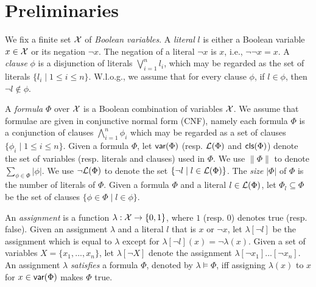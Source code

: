 \section{Preliminaries}\label{sec:prel}

We fix a finite set  $\mathcal{X}$ of \emph{Boolean variables}.
A \emph{literal} $l$ is either a Boolean variable $x\in \mathcal{X}$ or its negation $\neg x$.
The negation of a literal $\neg x$ is $x$, i.e., $\neg\neg x=x$.
A \emph{clause} $\phi$ is a disjunction of literals $\bigvee_{i=1}^n l_i$, which may be regarded as
the set of literals $\{l_i\mid 1\leq i\leq n\}$. W.l.o.g., we assume that for every
clause $\phi$, if $l\in\phi$, then $\neg l\not\in \phi$.

A \emph{formula} $\Phi$ over $\mathcal{X}$ is a Boolean combination of variables $\mathcal{X}$.
We assume that formulae are given in conjunctive normal
form (CNF), namely each formula $\Phi$ is a conjunction of clauses $\bigwedge_{i=1}^n\phi_i$ which may be regarded as a set of clauses $\{\phi_i\mid 1\leq i\leq n\}$. Given a formula $\Phi$, let $\textsf{var}(\Phi)$ (resp. ${\cal L}(\Phi)$  and $\textsf{cls}(\Phi)$) denote the set of variables (resp. literals and clauses) used in $\Phi$.
We use $\|\Phi\|$ to denote $\sum_{\phi\in\Phi}|\phi|$.
We use $\neg{\cal L}(\Phi)$ to denote the set $\{\neg l \mid l\in {\cal L}(\Phi)\}$.
The \emph{size} $|\Phi|$ of $\Phi$ is the number of literals of $\Phi$.
Given a formula $\Phi$ and a literal $l\in{\cal L}(\Phi)$,
let $\Phi_{l}\subseteq \Phi$ be the set of clauses $\{\phi\in\Phi\mid l\in\phi\}$.


An \emph{assignment} is a function $\lambda: \mathcal{X} \rightarrow \{0,1\}$, where $1$ (resp. $0$) denotes true (resp. false).
Given an assignment $\lambda$ and a literal $l$ that is $x$ or $\neg x$, let $\lambda[\neg l]$ be the assignment which is equal to $\lambda$
except for $\lambda[\neg l](x)=\neg \lambda(x)$. Given a set of variables $X=\{x_1,...,x_n\}$, let $\lambda[\neg X]$ denote the assignment
$\lambda[\neg x_1]...[\neg x_n]$.
An assignment $\lambda$ \emph{satisfies} a formula $\Phi$, denoted by $\lambda\models \Phi$, iff assigning $\lambda(x)$ to $x$ for $x\in\textsf{var}(\Phi)$ makes $\Phi$ true.

